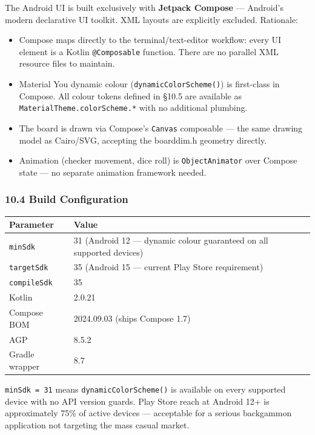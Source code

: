 \documentclass[11pt,a4paper]{article}
\providecommand{\tightlist}{\setlength{\itemsep}{2pt}\setlength{\parskip}{0pt}}
\begin{document}
The Android UI is built exclusively with \textbf{Jetpack Compose} ---
Android's modern declarative UI toolkit. XML layouts are explicitly
excluded. Rationale:

\begin{itemize}
\tightlist
\item
  Compose maps directly to the terminal/text-editor workflow: every UI
  element is a Kotlin \texttt{@Composable} function. There are no
  parallel XML resource files to maintain.
\item
  Material You dynamic colour (\texttt{dynamicColorScheme()}) is
  first-class in Compose. All colour tokens defined in §10.5 are
  available as \texttt{MaterialTheme.colorScheme.*} with no additional
  plumbing.
\item
  The board is drawn via Compose's \texttt{Canvas} composable --- the
  same drawing model as Cairo/SVG, accepting the boarddim.h geometry
  directly.
\item
  Animation (checker movement, dice roll) is \texttt{ObjectAnimator}
  over Compose state --- no separate animation framework needed.
\end{itemize}

\subsubsection{10.4 Build Configuration}\label{build-configuration}

\begin{longtable}[]{@{}ll@{}}
\toprule\noalign{}
Parameter & Value \\
\midrule\noalign{}
\endhead
\bottomrule\noalign{}
\endlastfoot
\texttt{minSdk} & 31 (Android 12 --- dynamic colour guaranteed on all supported devices) \\
\texttt{targetSdk} & 35 (Android 15 --- current Play Store requirement) \\
\texttt{compileSdk} & 35 \\
Kotlin & 2.0.21 \\
Compose BOM & 2024.09.03 (ships Compose 1.7) \\
AGP & 8.5.2 \\
Gradle wrapper & 8.7 \\
\end{longtable}

\texttt{minSdk = 31} means \texttt{dynamicColorScheme()} is available on
every supported device with no API version guards. Play Store reach at
Android 12+ is approximately 75\% of active devices --- acceptable for a
serious backgammon application not targeting the mass casual market.
\end{document}
